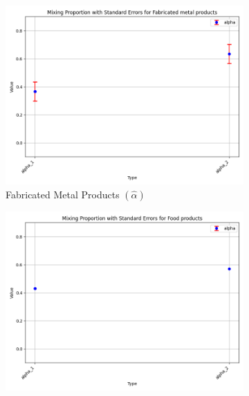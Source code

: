 \documentclass{article}
\begin{document}
\begin{figure}[ht!]
    \centering 
    \caption{AR(1) 2-Component Mixture Model with $\log K$, Import and CIIU}
    \begin{subfigure}[t]{0.32\textwidth}
        \centering
        \includegraphics[width=\textwidth]{figure/empirical_ar1_mixture_kmshare_ciiu_alpha_with_error_bars_Fabricated metal products.png}
        \caption{Fabricated Metal Products $(\hat\alpha)$}
    \end{subfigure}
    \begin{subfigure}[t]{0.32\textwidth}
        \centering
        \includegraphics[width=\textwidth]{figure/empirical_ar1_mixture_kmshare_ciiu_alpha_with_error_bars_Food products.png}

\end{subfigure}
\end{figure}
\end{document}
